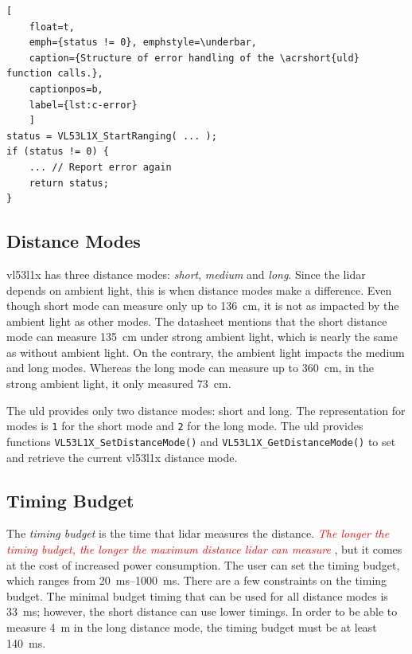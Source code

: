\documentclass[
  digital,     %
  oneside,     %
  nosansbold,  %
  nocolorbold, %
  nolof,         %
  nolot,         %
]{fithesis4}
\newcommand{\TODO}[1]{\textcolor{red}{\textit{#1}}}
\begin{document}
{{{\begin{lstlisting}[
    float=t,
    emph={status != 0}, emphstyle=\underbar,
    caption={Structure of error handling of the \acrshort{uld} function calls.},
    captionpos=b,
    label={lst:c-error}
    ]
status = VL53L1X_StartRanging( ... );
if (status != 0) {
    ... // Report error again
    return status;
}
\end{lstlisting}

\subsection{ Distance Modes } \label{sec:distance-modes}

\gls{vl53l1x} has three distance modes: \emph{short}, \emph{medium} and \emph{long}. Since the \acrshort{lidar} depends on ambient light, this is when distance modes make a difference. Even though short mode can measure only up to \qty{136}{\centi\metre}, it is not as impacted by the ambient light as other modes. The datasheet \cite{vl53l1x} mentions that the short distance mode can measure \qty{135}{\centi\metre} under strong ambient light, which is nearly the same as without ambient light. On the contrary, the ambient light impacts the medium and long modes. Whereas the long mode can measure up to \qty{360}{\centi\metre}, in the strong ambient light, it only measured \qty{73}{\centi\metre}.

The \acrshort{uld} provides only two distance modes: short and long. The representation for modes is \lstinline|1| for the short mode and \lstinline|2| for the long mode. The \acrshort{uld} provides functions \lstinline|VL53L1X_SetDistanceMode()| and \lstinline|VL53L1X_GetDistanceMode()| to set and retrieve the current \gls{vl53l1x} distance mode.



\subsection{ Timing Budget } \label{TB}

The \emph{timing budget} is the time that \acrshort{lidar} measures the distance. \TODO{ The longer the timing budget, the longer the maximum distance \acrshort{lidar} can measure }, but it comes at the cost of increased power consumption. The user can set the timing budget, which ranges from \qtyrange{20}{1000}{\milli\second}. There are a few constraints on the timing budget. The minimal budget timing that can be used for all distance modes is \qty{33}{\milli\second}; however, the short distance can use lower timings. In order to be able to measure \qty{4}{\metre} in the long distance mode, the timing budget must be at least \qty{140}{\milli\second}.

}}}
\end{document}
